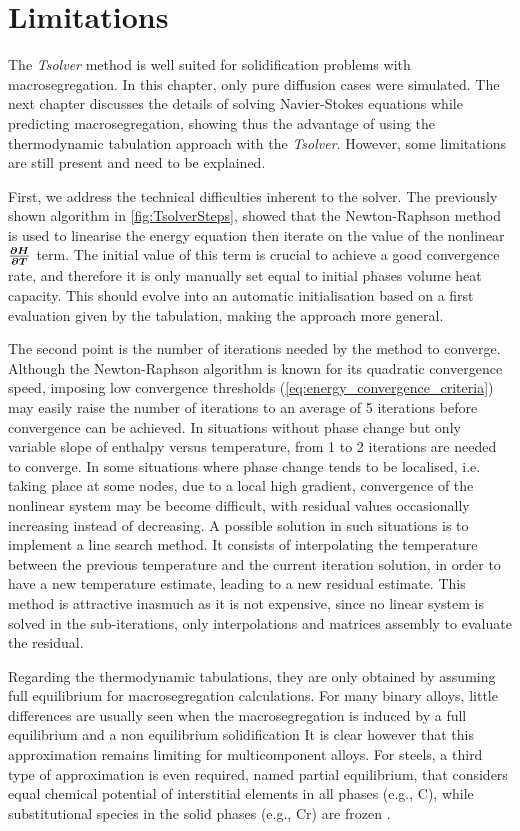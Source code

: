 \section{Limitations}

The \emph{Tsolver} method is well suited for 
solidification problems with macrosegregation. In this chapter, only pure diffusion cases were simulated. 
The next chapter discusses the details of solving Navier-Stokes equations while predicting macrosegregation, 
showing thus the advantage of using the thermodynamic tabulation approach with the \emph{Tsolver}.
However, some limitations are still present and need to be explained.

First, we address the technical difficulties inherent to the solver. The previously shown algorithm in \cref{fig:TsolverSteps},
showed that the Newton-Raphson method is used to linearise the energy equation then iterate on the value of the nonlinear
$\boldsymbol{\frac{\partial H}{\partial T}}$ term. The initial value of this term is crucial to achieve a good convergence rate, and therefore it is only manually set equal 
to initial phases volume heat capacity. This should evolve into an automatic initialisation based on a first evaluation given by the tabulation,
making the approach more general. 

The second point is the number of iterations needed by the method to converge.
Although the Newton-Raphson algorithm is known for its quadratic convergence speed, imposing low convergence thresholds (\cref{eq:energy_convergence_criteria}) 
may easily raise the number of iterations to an average of 5 iterations before convergence can be achieved. In situations without
phase change but only variable slope of enthalpy versus temperature, from 1 to 2 iterations are needed to converge.
In some situations where phase change tends to be localised, i.e. taking place at some nodes, due to a local high gradient, convergence of
the nonlinear system may be become difficult, with residual values occasionally increasing instead of decreasing.  
A possible solution in such situations is to implement a line search method. It consists of interpolating the temperature between the previous temperature
and the current iteration solution, in order to have a new temperature estimate, leading to a new residual estimate. This method is attractive inasmuch as
it is not expensive, since no linear system is solved in the sub-iterations, only interpolations and matrices assembly to evaluate the residual.

Regarding the thermodynamic tabulations, they are only obtained by assuming full equilibrium for macrosegregation calculations. 
For many binary alloys, little differences are usually seen when the macrosegregation is induced by a full equilibrium and a non equilibrium solidification
It is clear however that this approximation remains limiting for multicomponent alloys. 
For steels, a third type of approximation is even required, named partial equilibrium, that considers equal chemical potential 
of interstitial elements in all phases (e.g., C), while substitutional species in the solid phases (e.g., Cr) are frozen \citep{koshikawa_computation_2014}. 




